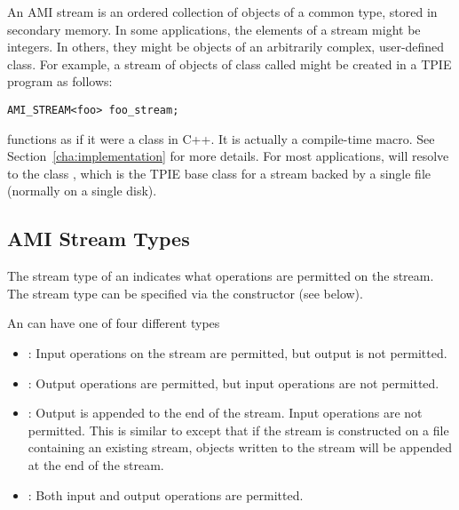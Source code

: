 An AMI stream is an ordered collection of objects of a
common type, stored in secondary memory.  In some
applications, the elements of a stream might be integers.
In others, they might be objects of an arbitrarily complex,
user-defined class.  For example, a stream of objects of class
 called  might be created in a
TPIE program as follows:

\begin{verbatim}
AMI_STREAM<foo> foo_stream;
\end{verbatim}

 functions as if it were a class in C++. It
is actually a compile-time macro. See
Section~\ref{cha:implementation} for more details. For most
applications,  will resolve to the class
, which is the TPIE base class for
a stream backed by a single file (normally on a single
disk).


\subsection{AMI Stream Types}

The stream type of an  indicates what
operations are permitted on the stream.
The stream type can be specified via the
constructor (see below).  


An  can have one of four different types
\begin{itemize}
    
    \item {}: Input operations on
    the stream are permitted, but output is not permitted.
    
    \item {}: Output operations are
    permitted, but input operations are not permitted. 
    
    \item {}: Output is appended
    to the end of the stream. Input operations are not
    permitted. This is similar to
     except that if the stream is
    constructed on a file containing an existing stream,
    objects written to the stream will be appended at the
    end of the stream.

\item {}: Both input and output
    operations are permitted.
\end{itemize}

